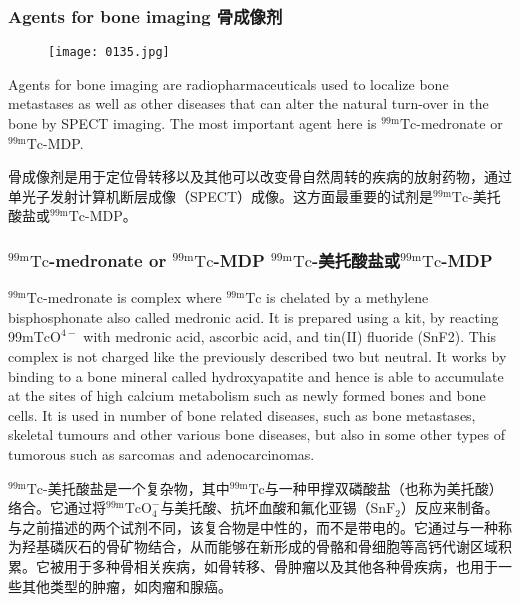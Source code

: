\documentclass[dvipsnames, svgnames,a4paper,11pt]{article}
\begin{document}
\subsubsection{Agents for bone imaging 骨成像剂 }

\begin{figure}[h]
	\centering
    \texttt{[image: 0135.jpg]}    
     \label{fig137}
\end{figure}

 Agents for bone imaging are radiopharmaceuticals used to localize bone metastases
 as well as other diseases that can alter the natural turn-over in the bone by SPECT
 imaging. The most important agent here is ${}^\mathrm{99m}\mathrm{Tc}$-medronate or ${}^\mathrm{99m}\mathrm{Tc}$-MDP.

骨成像剂是用于定位骨转移以及其他可以改变骨自然周转的疾病的放射药物，通过单光子发射计算机断层成像（SPECT）成像。这方面最重要的试剂是${}^\mathrm{99m}\mathrm{Tc}$-美托酸盐或${}^\mathrm{99m}\mathrm{Tc}$-MDP。

\subsubsection{${}^\mathrm{99m}\mathrm{Tc}$-medronate or ${}^\mathrm{99m}\mathrm{Tc}$-MDP ${}^\mathrm{99m}\mathrm{Tc}$-美托酸盐或${}^\mathrm{99m}\mathrm{Tc}$-MDP }

$\mathrm{{}^{99m}Tc}$-medronate is complex where $\mathrm{{}^{99m}Tc}$ is chelated by a methylene
bisphosphonate also called medronic acid. It is prepared using a kit, by reacting
99m$\mathrm{TcO^{4-}}$ with medronic acid, ascorbic acid, and tin(II) fluoride (SnF2). This complex
is not charged like the previously described two but neutral. It works by binding to a
bone mineral called hydroxyapatite and hence is able to accumulate at the sites of
high calcium metabolism such as newly formed bones and bone cells. It is used in
number of bone related diseases, such as bone metastases, skeletal tumours and
other various bone diseases, but also in some other types of tumorous such as
sarcomas and adenocarcinomas.

 ${}^\mathrm{99m}\mathrm{Tc}$-美托酸盐是一个复杂物，其中${}^\mathrm{99m}\mathrm{Tc}$与一种甲撑双磷酸盐（也称为美托酸）络合。它通过将${}^\mathrm{99m}\mathrm{TcO_4^-}$与美托酸、抗坏血酸和氟化亚锡（Sn$\mathrm{F}_2$）反应来制备。与之前描述的两个试剂不同，该复合物是中性的，而不是带电的。它通过与一种称为羟基磷灰石的骨矿物结合，从而能够在新形成的骨骼和骨细胞等高钙代谢区域积累。它被用于多种骨相关疾病，如骨转移、骨肿瘤以及其他各种骨疾病，也用于一些其他类型的肿瘤，如肉瘤和腺癌。
\end{document}
